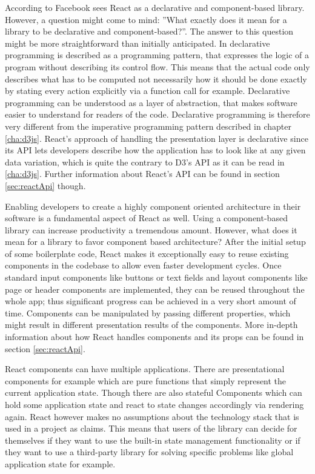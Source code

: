 According to \cite{React} Facebook sees React as a declarative and component-based library. However, a question might come to mind: ''What exactly does it mean for a library to be declarative and component-based?''. The answer to this question might be more straightforward than initially anticipated. In \cite{lloyd1994practical} declarative programming is described as a programming pattern, that expresses the logic of a program without describing its control flow. This means that the actual code only describes what has to be computed not necessarily how it should be done exactly by stating every action explicitly via a function call for example. Declarative programming can be understood as a layer of abstraction, that makes software easier to understand for readers of the code. Declarative programming is therefore very different from the imperative programming pattern described in chapter \ref{cha:d3js}. React's approach of handling the presentation layer is declarative since its API lets developers describe how the application has to look like at any given data variation, which is quite the contrary to D3's API as it can be read in \ref{cha:d3js}. Further information about React's API can be found in section \ref{sec:reactApi} though.

Enabling developers to create a highly component oriented architecture in their software is a fundamental aspect of React as well. Using a component-based library can increase productivity a tremendous amount. However, what does it mean for a library to favor component based architecture? After the initial setup of some boilerplate code, React makes it exceptionally easy to reuse existing components in the codebase to allow even faster development cycles. Once standard input components like buttons or text fields and layout components like page or header components are implemented, they can be reused throughout the whole app; thus significant progress can be achieved in a very short amount of time. Components can be manipulated by passing different properties, which might result in different presentation results of the components. More in-depth information about how React handles components and its props can be found in section \ref{sec:reactApi}.

React components can have multiple applications. There are presentational components for example which are pure functions that simply represent the current application state. Though there are also stateful Components which can hold some application state and react to state changes accordingly via rendering again. React however makes no assumptions about the technology stack that is used in a project as \cite{React} claims. This means that users of the library can decide for themselves if they want to use the built-in state management functionality or if they want to use a third-party library for solving specific problems like global application state for example.

